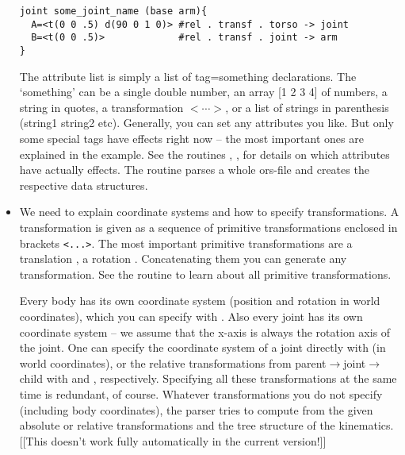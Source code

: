 \begin{itemize}
\begin{code}
\begin{verbatim}
joint some_joint_name (base arm){
  A=<t(0 0 .5) d(90 0 1 0)> #rel . transf . torso -> joint
  B=<t(0 0 .5)>             #rel . transf . joint -> arm
}
\end{verbatim}
\end{code}


The attribute list is simply a list of tag=something declarations. The
`something' can be a single double number, an array [1 2 3 4] of
numbers, a string in quotes, a transformation $<\cdots>$, or a list of
strings in parenthesis (string1 string2 etc). Generally, you can set
any attributes you like. But only some special tags have effects right
now -- the most important ones are explained in the example. See the
routines , , 
for details on which attributes have actually effects. The
routine  parses a whole ors-file and creates
the respective data structures.

\item We need to explain coordinate systems and how to specify
 transformations. A transformation is given as a sequence of primitive
transformations enclosed in brackets \lstinline$<...>$. The most
important primitive transformations are a translation ,
a rotation . Concatenating
them you can generate any transformation. See
the  routine to learn about all primitive
transformations.

Every body has its own coordinate system (position and rotation in
world coordinates), which you can specify
with . Also every joint has its own coordinate
system -- we assume that the x-axis is always the rotation axis of the
joint. One can specify the coordinate system of a joint directly
with  (in world coordinates), or the relative
transformations from parent$\to$joint$\to$child
with  and ,
respectively. Specifying all these transformations at the same time is
redundant, of course. Whatever transformations you do not specify
(including body coordinates), the parser tries to compute from the
given absolute or relative transformations and the tree structure of
the kinematics. [[This doesn't work fully automatically in the current
version!]]

\end{itemize}


\subsection{}

